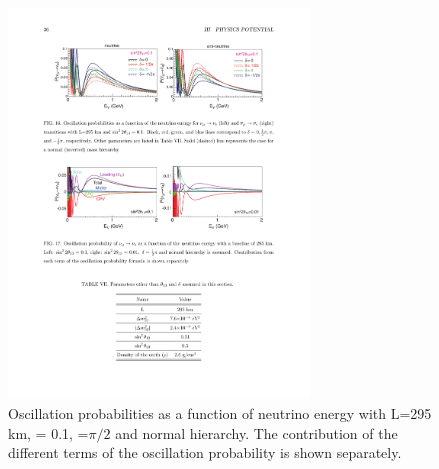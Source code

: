 

\begin{figure} [htbp!]
\begin{center}
\includegraphics[width=8cm]{figures/papp_prob_2.pdf}
\caption{\label{fig:t2kappprob} Oscillation probabilities as a function of neutrino energy with L=295 km, \stot = 0.1, \dcp=$\pi/2$ and normal hierarchy. The contribution of the different terms of the oscillation probability is shown separately.}
\end{center}
\end{figure}


